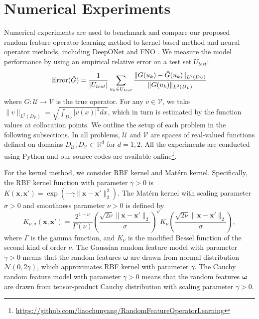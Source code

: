 \documentclass[11pt,twoside]{article}
\theoremstyle{plain}
\theoremstyle{definition}
\theoremstyle{remark}
\newcommand{\R}{\mathbb{R}}
\newcommand{\xb}{\mathbf{x}}
\newcommand{\Uc}{\mathcal{U}}
\newcommand{\Vc}{\mathcal{V}}
\newcommand{\Nc}{\mathcal{N}}
\newcommand{\omegab}{\boldsymbol\omega}
\begin{document}
\section{Numerical Experiments}
\label{Sec:experiment}
Numerical experiments are used to benchmark and compare our proposed random feature operator learning method to kernel-based method \cite{BATLLE2024kernel} and neural operator methods, including DeepONet \cite{DeepONet2021Lu} and FNO \cite{Li2020FourierNO}.
We measure the model performance by using an empirical relative error on a test set $U_{test}$: 
\begin{equation*}
\mathrm{Error}(\Hat{G}) = \frac{1}{|U_{test}|} \sum_{u_k\in U_{test}} \frac{\|G(u_k)-\hat{G}(u_k)\|_{L^2(D_\Vc)}}{\|G(u_k)\|_{L^2(D_\Vc)}}
\end{equation*}
where $G:\Uc\to\Vc$ is the true operator. For any $v\in\Vc$, we take $\|v\|_{L^2(D_\Vc)} = \sqrt{ \int_{D_\Vc} |v(x)|^2 dx}$, which in turn is estimated by the function values at collocation points. 
We outline the setup of each problem in the following subsections. In all problems, $\Uc$ and $\Vc$ are spaces of real-valued functions defined on domains $D_\Uc, D_\Vc\subset\R^d$ for $d=1,2$. 
All the experiments are conducted using Python and our source codes are available online\footnote{\url{https://github.com/liaochunyang/RandomFeatureOperatorLearning}}.

For the kernel method, we consider RBF kernel and Mat{\'e}rn kernel. Specifically, the RBF kernel function with parameter $\gamma>0$ is $K(\xb,\xb') = \exp(-\gamma\|\xb- \xb'\|_2^2)$. The Mat{\' e}rn kernel with scaling parameter $\sigma>0$ and smoothness parameter $\nu>0$ is defined by 
$$K_{\nu, \sigma}(\xb,\xb') = \frac{2^{1-\nu}}{\Gamma(\nu)} \left( \frac{\sqrt{2\nu}\|\xb-\xb'\|_2}{\sigma} \right)^\nu K_\nu\left( \frac{\sqrt{2\nu}\|\xb-\xb'\|_2}{\sigma} \right),$$
where $\Gamma$ is the gamma function, and $K_\nu$ is the modified Bessel function of the second kind of order $\nu$.
The Gaussian random feature model with parameter $\gamma>0$ means that the random features $\omegab$ are drawn from normal distribution $\Nc(0,2\gamma)$, which approximates RBF kernel with parameter $\gamma$. The Cauchy random feature model with parameter $\gamma>0$ means that the random features $\omegab$ are drawn from tensor-product Cauchy distribution with scaling parameter $\gamma>0$.
\end{document}
